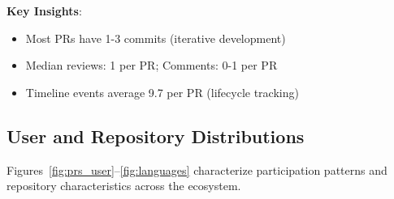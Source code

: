\documentclass[11pt]{article}
\begin{document}
\textbf{Key Insights}:
\begin{itemize}
    \item Most PRs have 1-3 commits (iterative development)
    \item Median reviews: 1 per PR; Comments: 0-1 per PR
    \item Timeline events average 9.7 per PR (lifecycle tracking)
\end{itemize}

\subsection{User and Repository Distributions}

Figures~\ref{fig:prs_user}--\ref{fig:languages} characterize participation patterns and repository characteristics across the ecosystem.
\end{document}
